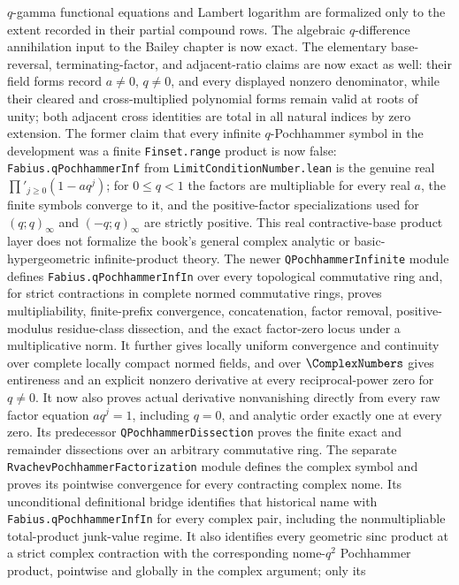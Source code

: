\documentclass[11pt,a4paper,oneside,openany]{book}
\theoremstyle{definition}
\theoremstyle{remark}
\begin{document}
\(q\)-gamma functional equations and Lambert logarithm are formalized only
to the extent recorded in their partial compound rows.  The algebraic
\(q\)-difference annihilation input to the Bailey chapter is now exact.  The
elementary base-reversal,
terminating-factor, and adjacent-ratio
claims are now exact as well: their field forms record \(a\ne0\), \(q\ne0\),
and every displayed nonzero denominator, while their cleared and
cross-multiplied polynomial forms remain valid at roots of unity; both
adjacent cross identities are total in all natural indices by zero extension.
The former
claim that every infinite \(q\)-Pochhammer symbol in
the development was a finite \texttt{Finset.range} product is now false:
\texttt{Fabius.qPochhammerInf} from \texttt{LimitConditionNumber.lean} is the genuine real
\(\prod'_{j\ge0}(1-aq^j)\); for \(0\le q<1\) the factors are multipliable for
every real \(a\), the finite symbols converge to it, and the positive-factor
specializations used for \((q;q)_\infty\) and \((-q;q)_\infty\) are strictly
positive.  This real contractive-base product layer does not formalize the
book's general complex analytic or basic-hypergeometric infinite-product
theory.  The newer \texttt{QPochhammerInfinite} module defines
\texttt{Fabius.qPochhammerInfIn} over every topological commutative ring and,
for strict contractions in complete normed commutative rings, proves
multipliability, finite-prefix convergence, concatenation, factor removal,
positive-modulus residue-class dissection, and the exact factor-zero locus
under a multiplicative norm.  It further gives locally uniform convergence
and continuity over complete locally compact normed fields, and over
\(\ComplexNumbers\) gives entireness and an explicit nonzero derivative at
every reciprocal-power zero for \(q\ne0\).  It now also proves actual
derivative nonvanishing directly from every raw factor equation \(aq^j=1\),
including \(q=0\), and analytic order exactly one at every zero.  Its predecessor
\texttt{QPochhammerDissection} proves the finite exact and remainder
dissections over an arbitrary commutative ring.  The separate
\texttt{RvachevPochhammerFactorization} module
defines the complex symbol and proves its pointwise convergence for every
contracting complex nome.  Its unconditional definitional bridge identifies
that historical name with \texttt{Fabius.qPochhammerInfIn} for every complex
pair, including the nonmultipliable total-product junk-value regime.  It also identifies every geometric sinc product
at a strict complex contraction with the corresponding nome-\(q^2\)
Pochhammer product, pointwise and globally in the complex argument; only its
\end{document}
